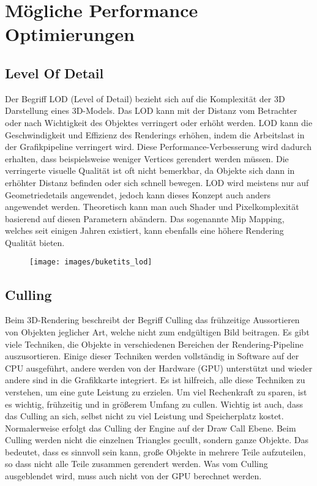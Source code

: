 \chapter{Mögliche Performance Optimierungen} \label{simon_performance}
\section{Level Of Detail}
Der Begriff LOD (Level of Detail) bezieht sich auf die Komplexität der 3D Darstellung eines 3D-Models. Das LOD kann mit der Distanz vom Betrachter oder nach Wichtigkeit des Objektes verringert oder erhöht werden. LOD kann die Geschwindigkeit und Effizienz des Renderings erhöhen, indem die Arbeitslast in der Grafikpipeline verringert wird. Diese Performance-Verbesserung wird dadurch erhalten, dass beispielsweise weniger Vertices gerendert werden müssen. Die verringerte visuelle Qualität ist oft nicht bemerkbar, da Objekte sich dann in erhöhter Distanz befinden oder sich schnell bewegen. LOD wird meistens nur auf Geometriedetails angewendet, jedoch kann dieses Konzept auch anders angewendet werden. Theoretisch kann man auch Shader und Pixelkomplexität basierend auf diesen Parametern abändern. Das sogenannte Mip Mapping, welches seit einigen Jahren existiert, kann ebenfalls eine höhere Rendering Qualität bieten.

\begin{figure}[H]
	\centering
	\texttt{[image: images/buketits\_lod]}
	\caption{\cite{_lod_formeshes}}
\end{figure}


\section{Culling}
Beim 3D-Rendering beschreibt der Begriff Culling das frühzeitige Aussortieren von Objekten jeglicher Art, welche nicht zum endgültigen Bild beitragen. Es gibt viele Techniken, die Objekte in verschiedenen Bereichen der Rendering-Pipeline auszusortieren. Einige dieser Techniken werden vollständig in Software auf der CPU ausgeführt, andere werden von der Hardware (GPU) unterstützt und wieder andere sind in die Grafikkarte integriert. Es ist hilfreich, alle diese Techniken zu verstehen, um eine gute Leistung zu erzielen. Um viel Rechenkraft zu sparen, ist es wichtig, frühzeitig und in größerem Umfang zu cullen. Wichtig ist auch, dass das Culling an sich, selbst nicht zu viel Leistung und Speicherplatz kostet.
Normalerweise erfolgt das Culling der Engine auf der Draw Call Ebene. Beim Culling werden nicht die einzelnen Triangles gecullt, sondern ganze Objekte. Das bedeutet, dass es sinnvoll sein kann, große Objekte in mehrere Teile aufzuteilen, so dass nicht alle Teile zusammen gerendert werden.
Was vom Culling ausgeblendet wird, muss auch nicht von der GPU berechnet werden.

